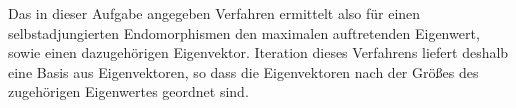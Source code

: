 \documentclass[a4paper,10pt]{scrartcl}
\begin{document}
Das in dieser Aufgabe angegeben Verfahren ermittelt also für einen selbstadjungierten Endomorphismen den maximalen auftretenden Eigenwert, sowie einen dazugehörigen Eigenvektor.
Iteration dieses Verfahrens liefert deshalb eine Basis aus Eigenvektoren, so dass die Eigenvektoren nach der Größes des zugehörigen Eigenwertes geordnet sind.
\end{document}
